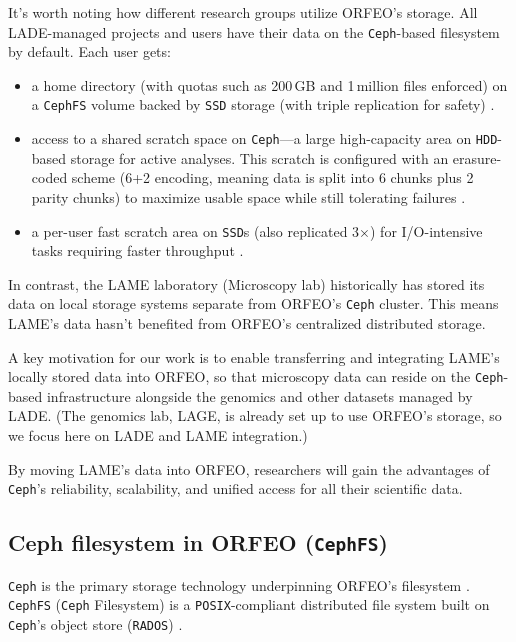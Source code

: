 It’s worth noting how different research groups utilize ORFEO’s storage. All 
LADE-managed projects and users have their data on the \texttt{Ceph}-based 
filesystem by default. Each user gets:
\begin{itemize}
	\item a home directory (with quotas such as 200\,GB and 1\,million files 
	enforced) on a \texttt{CephFS} volume backed by \texttt{SSD} storage 
	(with triple replication for safety) \parencite{ORFEO_Docs_Storage}.
	\item access to a shared scratch space on \texttt{Ceph}—a large 
	high-capacity area on \texttt{HDD}-based storage for active analyses. This 
	scratch is configured with an erasure-coded scheme (6+2 encoding, meaning 
	data is split into 6 chunks plus 2 parity chunks) to maximize usable space 
	while still tolerating failures \parencite{Ceph_EC,Ceph_RADOS}.
	\item a per-user fast scratch area on \texttt{SSD}s (also replicated 3$\times$) 
	for I/O-intensive tasks requiring faster throughput \parencite{Ceph_Pools}.
\end{itemize}

In contrast, the LAME laboratory (Microscopy lab) historically has stored its 
data on local storage systems separate from ORFEO’s \texttt{Ceph} cluster. This 
means LAME’s data hasn’t benefited from ORFEO’s centralized distributed storage. 

\medskip

A key motivation for our work is to enable transferring and integrating LAME’s 
locally stored data into ORFEO, so that microscopy data can reside on the 
\texttt{Ceph}-based infrastructure alongside the genomics and other datasets 
managed by LADE. (The genomics lab, LAGE, is already set up to use ORFEO’s 
storage, so we focus here on LADE and LAME integration.) 

By moving LAME’s data into ORFEO, researchers will gain the advantages of 
\texttt{Ceph}’s reliability, scalability, and unified access for all their 
scientific data.


\subsection{Ceph filesystem in ORFEO (\texttt{CephFS})}

\texttt{Ceph} is the primary storage technology underpinning ORFEO’s 
filesystem \parencite{ORFEO_Docs_Storage}. \texttt{CephFS} (\texttt{Ceph} 
Filesystem) is a \texttt{POSIX}-compliant distributed file system built on 
\texttt{Ceph}’s object store (\texttt{RADOS}) \parencite{CephFS}. 

